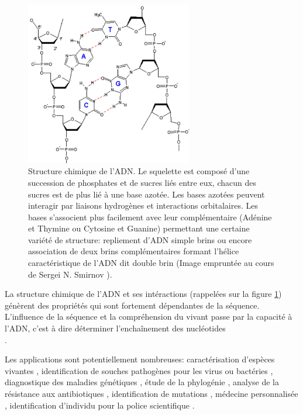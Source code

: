\documentclass[a4paper,11pt]{article}
\begin{document}
\begin{figure}[H]
\begin{center}
\includegraphics[width=0.65\textwidth]{adn.jpg}

\caption{Structure chimique de l'ADN. Le squelette est composé d'une succession de phosphates et de sucres liés entre eux, chacun des sucres est de plus lié à une base azotée. Les bases azotées peuvent interagir par liaisons hydrogènes et interactions orbitalaires. Les bases s'associent plus facilement avec leur complémentaire (Adénine et Thymine ou Cytosine et Guanine) permettant une certaine variété de structure: repliement d'ADN simple brins ou encore association de deux brins complémentaires formant l'hélice caractéristique de l'ADN dit double brin (Image empruntée au cours de Sergei N. Smirnov \cite{adnjpg}).}
\label{adn}
\end{center}
\end{figure}

La structure chimique de l'ADN et ses intéractions (rappelées sur la figure \ref{adn}) génèrent des propriétés qui sont fortement dépendantes de la séquence. L'influence de la séquence et la compréhension du vivant passe par la capacité à l'ADN, c'est à dire déterminer l'enchaînement des nucléotides\\.

Les applications sont potentiellement nombreuses: caractérisation d'espèces vivantes \cite{Sanggaard2014}, identification de souches pathogènes pour les virus ou bactéries \cite{Janda2007}, diagnostique des maladies génétiques \cite{Saunders2012}, étude de la phylogénie \cite{Neves2011}, analyse de la résistance aux antibiotiques  \cite{Davies2010}, identification de mutations \cite{Schneeberger2009}, médecine personnalisée \cite{Hamburg2010}, identification d'individu pour la police scientifique \cite{Wilson1995}.\\
\end{document}
